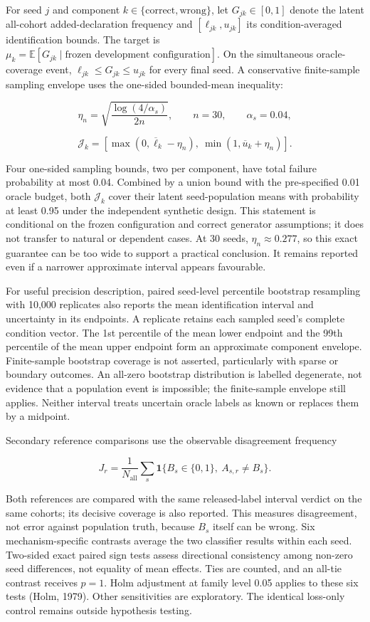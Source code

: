 \documentclass[
]{article}
\begin{document}
For seed \(j\) and component
\(k\in\{\mathrm{correct},\mathrm{wrong}\}\), let \(G_{jk}\in[0,1]\)
denote the latent all-cohort added-declaration frequency and
\([\ell_{jk},u_{jk}]\) its condition-averaged identification bounds. The
target is
\(\mu_k=\mathbb{E}[G_{jk}\mid\text{frozen development configuration}]\).
On the simultaneous oracle-coverage event,
\(\ell_{jk}\le G_{jk}\le u_{jk}\) for every final seed. A conservative
finite-sample sampling envelope uses the one-sided bounded-mean
inequality:

\[
\eta_n=\sqrt{\frac{\log(4/\alpha_s)}{2n}},
\qquad n=30,
\qquad \alpha_s=0.04,
\]

\[
\mathcal{J}_k=\left[\max(0,\overline{\ell}_k-\eta_n),\ \min(1,\overline{u}_k+\eta_n)\right].
\]

Four one-sided sampling bounds, two per component, have total failure
probability at most 0.04. Combined by a union bound with the
pre-specified 0.01 oracle budget, both \(\mathcal{J}_k\) cover their
latent seed-population means with probability at least 0.95 under the
independent synthetic design. This statement is conditional on the
frozen configuration and correct generator assumptions; it does not
transfer to natural or dependent cases. At 30 seeds,
\(\eta_n\approx0.277\), so this exact guarantee can be too wide to
support a practical conclusion. It remains reported even if a narrower
approximate interval appears favourable.

For useful precision description, paired seed-level percentile bootstrap
resampling with 10,000 replicates also reports the mean identification
interval and uncertainty in its endpoints. A replicate retains each
sampled seed's complete condition vector. The 1st percentile of the mean
lower endpoint and the 99th percentile of the mean upper endpoint form
an approximate component envelope. Finite-sample bootstrap coverage is
not asserted, particularly with sparse or boundary outcomes. An all-zero
bootstrap distribution is labelled degenerate, not evidence that a
population event is impossible; the finite-sample envelope still
applies. Neither interval treats uncertain oracle labels as known or
replaces them by a midpoint.

Secondary reference comparisons use the observable disagreement
frequency

\[
J_r=\frac{1}{N_{\mathrm{all}}}\sum_s\mathbf{1}\{B_s\in\{0,1\},\ A_{s,r}\ne B_s\}.
\]

Both references are compared with the same released-label interval
verdict on the same cohorts; its decisive coverage is also reported.
This measures disagreement, not error against population truth, because
\(B_s\) itself can be wrong. Six mechanism-specific contrasts average
the two classifier results within each seed. Two-sided exact paired sign
tests assess directional consistency among non-zero seed differences,
not equality of mean effects. Ties are counted, and an all-tie contrast
receives \(p=1\). Holm adjustment at family level 0.05 applies to these
six tests (Holm, 1979). Other sensitivities are exploratory. The
identical loss-only control remains outside hypothesis testing.
\end{document}
